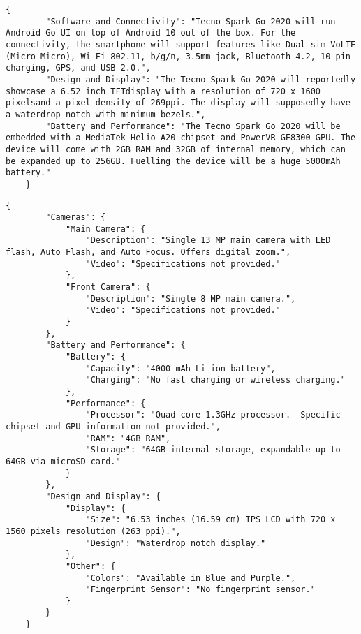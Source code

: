 \begin{figure*}[ht]
    \begin{lstlisting}[style=reviews, frame = single, caption=Output generated with Mistral Instruct trained with eC-Tab2Text., label=code:JSON-Mistral-eC-Tab2Text]
    {
        "Software and Connectivity": "Tecno Spark Go 2020 will run Android Go UI on top of Android 10 out of the box. For the connectivity, the smartphone will support features like Dual sim VoLTE (Micro-Micro), Wi-Fi 802.11, b/g/n, 3.5mm jack, Bluetooth 4.2, 10-pin charging, GPS, and USB 2.0.",
        "Design and Display": "The Tecno Spark Go 2020 will reportedly showcase a 6.52 inch TFTdisplay with a resolution of 720 x 1600 pixelsand a pixel density of 269ppi. The display will supposedly have a waterdrop notch with minimum bezels.",
        "Battery and Performance": "The Tecno Spark Go 2020 will be embedded with a MediaTek Helio A20 chipset and PowerVR GE8300 GPU. The device will come with 2GB RAM and 32GB of internal memory, which can be expanded up to 256GB. Fuelling the device will be a huge 5000mAh battery."
    }
    \end{lstlisting}
    \end{figure*}
    \begin{figure*}
    \begin{lstlisting}[style=reviews, frame = single, caption=Output generated with Gemini1.5-flash., label=code:JSON-Gemini]
    {
        "Cameras": {
            "Main Camera": {
                "Description": "Single 13 MP main camera with LED flash, Auto Flash, and Auto Focus. Offers digital zoom.",
                "Video": "Specifications not provided."
            },
            "Front Camera": {
                "Description": "Single 8 MP main camera.",
                "Video": "Specifications not provided."
            }
        },
        "Battery and Performance": {
            "Battery": {
                "Capacity": "4000 mAh Li-ion battery",
                "Charging": "No fast charging or wireless charging."
            },
            "Performance": {
                "Processor": "Quad-core 1.3GHz processor.  Specific chipset and GPU information not provided.",
                "RAM": "4GB RAM",
                "Storage": "64GB internal storage, expandable up to 64GB via microSD card."
            }
        },
        "Design and Display": {
            "Display": {
                "Size": "6.53 inches (16.59 cm) IPS LCD with 720 x 1560 pixels resolution (263 ppi).",
                "Design": "Waterdrop notch display."
            },
            "Other": {
                "Colors": "Available in Blue and Purple.",
                "Fingerprint Sensor": "No fingerprint sensor."
            }
        }
    }
    \end{lstlisting}
    \end{figure*}
